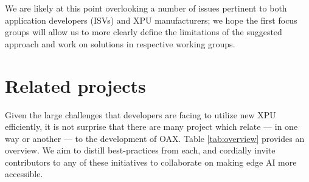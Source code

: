 \documentclass{article}
\begin{document}
We are likely at this point overlooking a number of issues pertinent to both application developers (ISVs) and XPU manufacturers; we hope the first focus groups will allow us to more clearly define the limitations of the suggested approach and work on solutions in respective working groups.

\section{Related projects}

Given the large challenges that developers are facing to utilize new XPU efficiently, it is not surprise that there are many project which relate --- in one way or another --- to the development of OAX. Table \ref{tab:overview} provides an overview. We aim to distill best-practices from each, and cordially invite contributors to any of these initiatives to collaborate on making edge AI more accessible.
\end{document}

